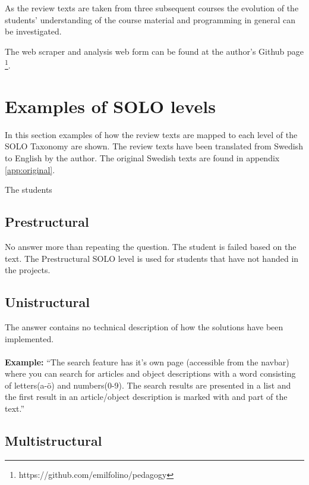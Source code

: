 \documentclass[twoside,twocolumn,a4paper,11pt,english]{article}
\begin{document}
As the review texts are taken from three subsequent courses the evolution of the students' understanding of the course material and programming in general can be investigated.

The web scraper and analysis web form can be found at the author's Github page \footnote{https://github.com/emilfolino/pedagogy}.




\section{Examples of SOLO levels} \label{sec:examples}

In this section examples of how the review texts are mapped to each level of the SOLO Taxonomy are shown. The review texts have been translated from Swedish to English by the author. The original Swedish texts are found in appendix \ref{app:original}.

The students

\subsection{Prestructural}

No answer more than repeating the question. The student is failed based on the text. The Prestructural SOLO level is used for students that have not handed in the projects.

\subsection{Unistructural}

The answer contains no technical description of how the solutions have been implemented.
\\
\\
\textbf{Example:} ``The search feature has it's own page (accessible from the navbar) where you can search for articles and object descriptions with a word consisting of letters(a-ö) and numbers(0-9). The search results are presented in a list and the first result in an article/object description is marked with and part of the text.''

\subsection{Multistructural}
\end{document}
